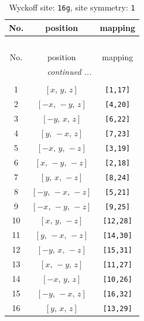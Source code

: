 \documentclass[fleqn,8pt]{jsarticle}
\begin{document}
\begin{longtable}{ccc}
\caption{Wyckoff site: {\tt 16g}, site symmetry: {\tt 1}}
 \\
 \hline \hline
No. & position & mapping \\ \hline \endfirsthead

\multicolumn{2}{l}{\tablename\ \thetable{}} \\
 \hline \hline
No. & position & mapping \\ \hline \endhead

 \hline \hline
\multicolumn{2}{r}{\footnotesize\it continued ...} \\ \endfoot

 \hline \hline
\multicolumn{2}{r}{} \\ \endlastfoot

1 & $\left[ x,\, y,\, z \right]$ & {\tt [1,17]} \\ \hline
2 & $\left[ - x,\, - y,\, z \right]$ & {\tt [4,20]} \\ \hline
3 & $\left[ - y,\, x,\, z \right]$ & {\tt [6,22]} \\ \hline
4 & $\left[ y,\, - x,\, z \right]$ & {\tt [7,23]} \\ \hline
5 & $\left[ - x,\, y,\, - z \right]$ & {\tt [3,19]} \\ \hline
6 & $\left[ x,\, - y,\, - z \right]$ & {\tt [2,18]} \\ \hline
7 & $\left[ y,\, x,\, - z \right]$ & {\tt [8,24]} \\ \hline
8 & $\left[ - y,\, - x,\, - z \right]$ & {\tt [5,21]} \\ \hline
9 & $\left[ - x,\, - y,\, - z \right]$ & {\tt [9,25]} \\ \hline
10 & $\left[ x,\, y,\, - z \right]$ & {\tt [12,28]} \\ \hline
11 & $\left[ y,\, - x,\, - z \right]$ & {\tt [14,30]} \\ \hline
12 & $\left[ - y,\, x,\, - z \right]$ & {\tt [15,31]} \\ \hline
13 & $\left[ x,\, - y,\, z \right]$ & {\tt [11,27]} \\ \hline
14 & $\left[ - x,\, y,\, z \right]$ & {\tt [10,26]} \\ \hline
15 & $\left[ - y,\, - x,\, z \right]$ & {\tt [16,32]} \\ \hline
16 & $\left[ y,\, x,\, z \right]$ & {\tt [13,29]} \\
\end{longtable}
\end{document}
